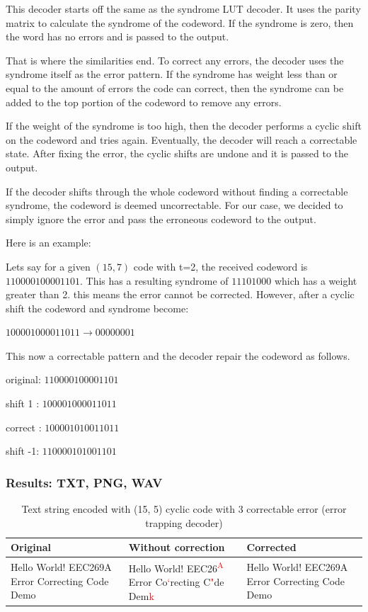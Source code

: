 \documentclass{article}
\begin{document}
This decoder starts off the same as the syndrome LUT decoder. It uses the parity matrix to calculate the syndrome of the codeword. If the syndrome is zero, then the word has no errors and is passed to the output.

That is where the similarities end. To correct any errors, the decoder uses the syndrome itself as the error pattern. If the syndrome has weight less than or equal to the amount of errors the code can correct, then the syndrome can be added to the top portion of the codeword to remove any errors.

If the weight of the syndrome is too high, then the decoder performs a cyclic shift on the codeword and tries again. Eventually, the decoder will reach a correctable state. After fixing the error, the cyclic shifts are undone and it is passed to the output.

If the decoder shifts through the whole codeword without finding a correctable syndrome, the codeword is deemed uncorrectable. For our case, we decided to simply ignore the error and pass the erroneous codeword to the output.

\begin{flushleft}
Here is an example:

\quad Lets say for a given $(15,7)$ code with t=2, the received codeword is $110000100001101$. This has a resulting syndrome of $11101000$ which has a weight greater than 2. this means the error cannot be corrected. However, after a cyclic shift the codeword and syndrome become:

$100001000011011 \rightarrow 00000001$

This now a correctable pattern and the decoder repair the codeword as follows.

original: $110000100001101$

shift 1 : $100001000011011$

correct : $100001010011011$

shift -1: $110000101001101$
\end{flushleft}

\subsubsection{Results: TXT, PNG, WAV}

\begin{table}[htb]
    \centering
    \caption{Text string encoded with (15, 5) cyclic code with 3 correctable error (error trapping decoder)}
    \label{tab:text-cyclic-15-5-trapping}
    \renewcommand{\arraystretch}{1.5}
    \begin{tabulary}{\textwidth}{ |L|L|L| } 
    \hline
    \textbf{Original} & \textbf{Without correction} & \textbf{Corrected} \\
    \hline
    Hello World! EEC269A Error Correcting Code Demo & Hello World! EEC26\textcolor{red}{\textsuperscript{A}} Error Co\textcolor{red}{`}recting C\textcolor{red}{"}de Dem\textcolor{red}{k} & Hello World!
    EEC269A Error Correcting Code Demo \\
    \hline
\end{tabulary}
\end{table}
\end{document}
